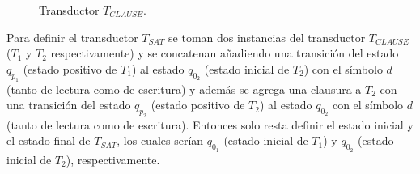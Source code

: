 \begin{figure}[h]
    \centering  \begin{otherlanguage}{english}
    \end{otherlanguage}
    \caption{Transductor $T_{CLAUSE}$.}
    \label{fig:transducer_clause} %
\end{figure}

Para definir el transductor $T_{SAT}$ se toman dos instancias del transductor $T_{CLAUSE}$ ($T_1$ y $T_2$ respectivamente) y se concatenan añadiendo una transición del estado $q_{p_1}$ (estado positivo de $T_1$) al estado $q_{0_2}$ (estado inicial de $T_2$) con el símbolo $d$ (tanto de lectura como de escritura) y además se agrega una clausura a $T_2$ con una transición del estado $q_{p_2}$ (estado positivo de $T_2$) al estado $q_{0_2}$ con el símbolo $d$ (tanto de lectura como de escritura). Entonces solo resta definir el estado inicial y el estado final de $T_{SAT}$, los cuales serían $q_{0_1}$ (estado inicial de $T_1$) y $q_{0_2}$ (estado inicial de $T_2$), respectivamente.


